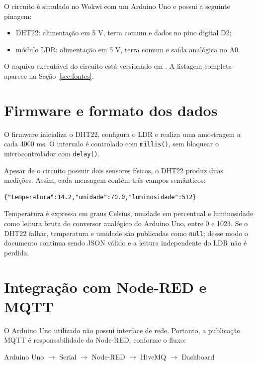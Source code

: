 \documentclass[12pt,a4paper]{article}
\begin{document}
O circuito é simulado no Wokwi com um Arduino Uno e possui a seguinte pinagem:

\begin{itemize}
  \item DHT22: alimentação em 5 V, terra comum e dados no pino digital D2;
  \item módulo LDR: alimentação em 5 V, terra comum e saída analógica no A0.
\end{itemize}

O arquivo executável do circuito está versionado em
. A listagem completa aparece na
Seção~\ref{sec:fontes}.

\section{Firmware e formato dos dados}

O firmware inicializa o DHT22, configura o LDR e realiza uma amostragem a cada
4000 ms. O intervalo é controlado com \texttt{millis()}, sem bloquear o
microcontrolador com \texttt{delay()}.

Apesar de o circuito possuir dois sensores físicos, o DHT22 produz duas
medições. Assim, cada mensagem contém três campos semânticos:

\begin{lstlisting}[caption={Mensagem serial produzida pelo firmware}]
{"temperatura":14.2,"umidade":70.0,"luminosidade":512}
\end{lstlisting}

Temperatura é expressa em graus Celsius, umidade em percentual e luminosidade
como leitura bruta do conversor analógico do Arduino Uno, entre 0 e 1023. Se o
DHT22 falhar, temperatura e umidade são publicadas como \texttt{null}; desse
modo o documento continua sendo JSON válido e a leitura independente do LDR
não é perdida.

\section{Integração com Node-RED e MQTT}

O Arduino Uno utilizado não possui interface de rede. Portanto, a publicação
MQTT é responsabilidade do Node-RED, conforme o fluxo:

\begin{center}
Arduino Uno \(\rightarrow\) Serial \(\rightarrow\) Node-RED
\(\rightarrow\) HiveMQ \(\rightarrow\) Dashboard
\end{center}
\end{document}

